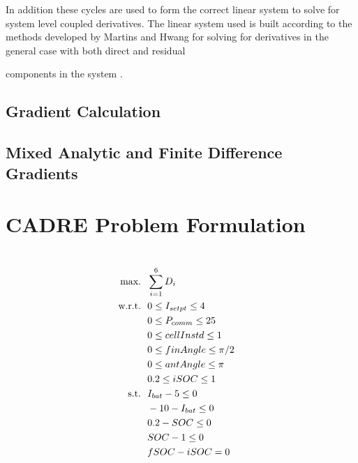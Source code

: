 \documentclass[]{aiaa-tc} %
\newcommand{\txt}{\textrm}
\begin{document}
    In addition these cycles are used to form the correct linear system to solve for system level coupled
    derivatives. The linear system used is built according to the methods developed by Martins and Hwang
    for solving for derivatives in the general case with both direct and residual

    components in the system \cite{Martins2012}.

    \subsection{Gradient Calculation}
    \subsection{Mixed Analytic and Finite Difference Gradients}

  \section{CADRE Problem Formulation}

    \begin{align}
        \\\txt{max.} &\ \ \sum_{i=1}^6 D_i \notag
        \\\txt{w.r.t.} & \ \ 0 \le I_{setpt} \le 4 \notag
        \\     & \ \ 0 \le P_{comm} \le 25 \notag
        \\     & \ \ 0 \le cellInstd \le 1 \notag
        \\     & \ \ 0 \le finAngle \le \pi/2 \notag
        \\     & \ \ 0 \le antAngle \le \pi \notag
        \\     & \ \ 0.2 \le iSOC \le 1 \notag
        \\\txt{s.t.} & \ \ I_{bat} - 5 \le 0 \notag
        \\     & \ \ -10 - I_{bat} \le 0 \notag
        \\     & \ \ 0.2 - SOC \le 0 \notag
        \\     & \ \ SOC - 1 \le 0 \notag
        \\     & \ \ fSOC - iSOC = 0 \notag
        \label{eqn:sellar_formulation}
    \end{align}
\end{document}
